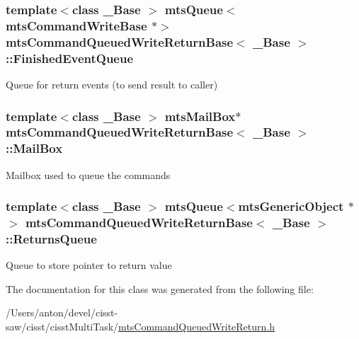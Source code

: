 \subsubsection[{Finished\+Event\+Queue}]{\setlength{\rightskip}{0pt plus 5cm}template$<$class \+\_\+\+Base $>$ {\bf mts\+Queue}$<${\bf mts\+Command\+Write\+Base} $\ast$$>$ {\bf mts\+Command\+Queued\+Write\+Return\+Base}$<$ \+\_\+\+Base $>$\+::Finished\+Event\+Queue\hspace{0.3cm}{\ttfamily [protected]}}\label{classmts_command_queued_write_return_base_aea7fcf280a846a7d73fb7ba81499e858}
Queue for return events (to send result to caller) \hypertarget{classmts_command_queued_write_return_base_ab619fecbd720f4b87db6169d1f210e16}{}
\subsubsection[{Mail\+Box}]{\setlength{\rightskip}{0pt plus 5cm}template$<$class \+\_\+\+Base $>$ {\bf mts\+Mail\+Box}$\ast$ {\bf mts\+Command\+Queued\+Write\+Return\+Base}$<$ \+\_\+\+Base $>$\+::Mail\+Box\hspace{0.3cm}{\ttfamily [protected]}}\label{classmts_command_queued_write_return_base_ab619fecbd720f4b87db6169d1f210e16}
Mailbox used to queue the commands \hypertarget{classmts_command_queued_write_return_base_a24118cfab2f7edbc060a3513787900c7}{}
\subsubsection[{Returns\+Queue}]{\setlength{\rightskip}{0pt plus 5cm}template$<$class \+\_\+\+Base $>$ {\bf mts\+Queue}$<${\bf mts\+Generic\+Object} $\ast$$>$ {\bf mts\+Command\+Queued\+Write\+Return\+Base}$<$ \+\_\+\+Base $>$\+::Returns\+Queue\hspace{0.3cm}{\ttfamily [protected]}}\label{classmts_command_queued_write_return_base_a24118cfab2f7edbc060a3513787900c7}
Queue to store pointer to return value 

The documentation for this class was generated from the following file\+:\begin{DoxyCompactItemize}
\item 
/\+Users/anton/devel/cisst-\/saw/cisst/cisst\+Multi\+Task/\hyperlink{mts_command_queued_write_return_8h}{mts\+Command\+Queued\+Write\+Return.\+h}\end{DoxyCompactItemize}
